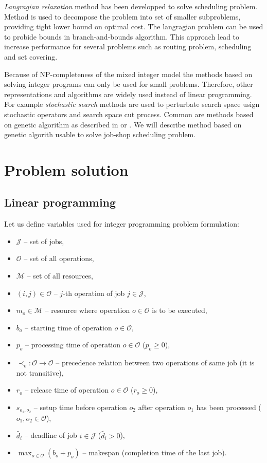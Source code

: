 \documentclass[a4paper,journal,twocolumn]{IEEEtran}
\begin{document}
\emph{Langragian relaxation} method has been developped to solve scheduling problem. 
Method is used to decompose the problem into set of smaller subproblems, 
providing tight lower bound on optimal cost.\cite{Hoi}
The langragian problem can be used to probide bounds in branch-and-bounds algorithm.
This approach lead to increase performance for several problems such as routing problem, scheduling and set covering.\cite{Fis}

Because of NP-completeness of the mixed integer model the methods based on solving integer programs can only be used for 
small problems. Therefore, other representations and algorithms are widely used instead of linear programming. For example
\emph{stochastic search} methods are used to perturbate search space usign stochastic operators and search space cut process.
Common are methods based on genetic algorithm as described in \cite{Sed} or \cite{Uni}. We will describe method based 
on genetic algorith usable to solve job-shop scheduling problem.

\section{Problem solution}
\subsection{Linear programming}
Let us define variables used for integer programming problem formulation:
\begin{itemize}
	\item $\mathcal{J}$ -- set of jobs,
	\item $\mathcal{O}$ -- set of all operations,
	\item $\mathcal{M}$ -- set of all resources,
	\item $\left(i,j\right) \in \mathcal{O}$ -- $j$-th operation of job $j \in \mathcal{J}$,
	\item $m_{o}\in\mathcal{M}$ -- resource where operation $o\in\mathcal{O}$ is to be executed,
	\item $b_{o}$ -- starting time of operation $o\in\mathcal{O}$,
	\item $p_{o}$ --  processing time of operation $o\in\mathcal{O}$ ($p_{o}\ge 0$),
	\item $\prec_o : \mathcal{O} \rightarrow \mathcal{O}$ -- precedence relation between two operations of same job (it is not transitive),
	\item $r_{o}$ -- release time of operation $o\in\mathcal{O}$ ($r_{o} \ge 0$),
	\item $s_{o_1,o_2}$ -- setup time before operation $o_2$ after operation $o_1$
	has been processed ($o_1,o_2\in\mathcal{O}$),
	\item $\tilde{d_i}$ -- deadline of job $i\in\mathcal{J}$ ($\tilde{d_i}> 0$),
	\item $\max_{o\in\mathcal{O}} (b_o+p_o)$ -- makespan (completion time of the last job).
\end{itemize}
\end{document}

